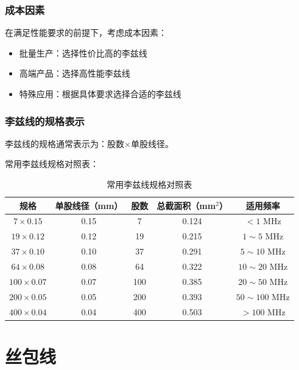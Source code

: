\documentclass[12pt,UTF8]{ctexbook}
\begin{document}
\subsection{成本因素}

在满足性能要求的前提下，考虑成本因素：

\begin{itemize}[leftmargin=2cm]
    \item 批量生产：选择性价比高的李兹线
    \item 高端产品：选择高性能李兹线
    \item 特殊应用：根据具体要求选择合适的李兹线
\end{itemize}

\subsection{李兹线的规格表示}

李兹线的规格通常表示为：股数$\times$单股线径。

常用李兹线规格对照表：

\begin{table}[H]
    \centering
    \begin{tabular}{|c|c|c|c|c|}
        \hline
        \textbf{规格} & \textbf{单股线径（mm）} & \textbf{股数} & \textbf{总截面积（mm$^2$）} & \textbf{适用频率} \\
        \hline
        $7 \times 0.15$ & 0.15 & 7 & 0.124 & $< 1$ MHz \\
        \hline
        $19 \times 0.12$ & 0.12 & 19 & 0.215 & $1 \sim 5$ MHz \\
        \hline
        $37 \times 0.10$ & 0.10 & 37 & 0.291 & $5 \sim 10$ MHz \\
        \hline
        $64 \times 0.08$ & 0.08 & 64 & 0.322 & $10 \sim 20$ MHz \\
        \hline
        $100 \times 0.07$ & 0.07 & 100 & 0.385 & $20 \sim 50$ MHz \\
        \hline
        $200 \times 0.05$ & 0.05 & 200 & 0.393 & $50 \sim 100$ MHz \\
        \hline
        $400 \times 0.04$ & 0.04 & 400 & 0.503 & $> 100$ MHz \\
        \hline
    \end{tabular}
    \caption{常用李兹线规格对照表}
    \label{tab:litz_wire_spec}
\end{table}

\chapter{丝包线}
\end{document}

